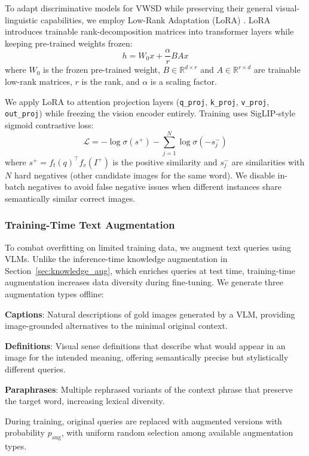 \documentclass[11pt]{article}
\begin{document}
To adapt discriminative models for VWSD while preserving their general visual-linguistic capabilities, we employ Low-Rank Adaptation (LoRA) \cite{hu2022lora}. LoRA introduces trainable rank-decomposition matrices into transformer layers while keeping pre-trained weights frozen:
\begin{equation}
h = W_0 x + \frac{\alpha}{r} BA x
\end{equation}
where $W_0$ is the frozen pre-trained weight, $B \in \mathbb{R}^{d \times r}$ and $A \in \mathbb{R}^{r \times d}$ are trainable low-rank matrices, $r$ is the rank, and $\alpha$ is a scaling factor.

We apply LoRA to attention projection layers (\texttt{q\_proj}, \texttt{k\_proj}, \texttt{v\_proj}, \texttt{out\_proj}) while freezing the vision encoder entirely. Training uses SigLIP-style sigmoid contrastive loss:
\begin{equation}
\mathcal{L} = -\log \sigma(s^+) - \sum_{j=1}^{N} \log \sigma(-s_j^-)
\end{equation}
where $s^+ = f_t(q)^\top f_v(I^+)$ is the positive similarity and $s_j^-$ are similarities with $N$ hard negatives (other candidate images for the same word). We disable in-batch negatives to avoid false negative issues when different instances share semantically similar correct images.

\subsubsection{Training-Time Text Augmentation}

To combat overfitting on limited training data, we augment text queries using VLMs. Unlike the inference-time knowledge augmentation in Section~\ref{sec:knowledge_aug}, which enriches queries at test time, training-time augmentation increases data diversity during fine-tuning. We generate three augmentation types offline:

\textbf{Captions}: Natural descriptions of gold images generated by a VLM, providing image-grounded alternatives to the minimal original context.

\textbf{Definitions}: Visual sense definitions that describe what would appear in an image for the intended meaning, offering semantically precise but stylistically different queries.

\textbf{Paraphrases}: Multiple rephrased variants of the context phrase that preserve the target word, increasing lexical diversity.

During training, original queries are replaced with augmented versions with probability $p_{\text{aug}}$, with uniform random selection among available augmentation types.
\end{document}

